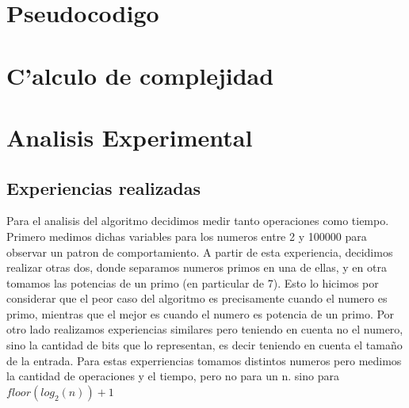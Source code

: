 \section{Pseudocodigo}


\section{C'alculo de complejidad}

\section{Analisis Experimental}
\subsection{Experiencias realizadas}
Para el analisis del algoritmo decidimos medir tanto operaciones como tiempo. Primero medimos dichas variables para los numeros entre 2 y 100000 para observar un patron de comportamiento. A partir de esta experiencia, decidimos realizar otras dos, donde separamos numeros primos en una de ellas, y en otra tomamos las potencias de un primo (en particular de 7). Esto lo hicimos por considerar que el peor caso del algoritmo es precisamente cuando el numero es primo, mientras que el mejor es cuando el numero es potencia de un primo. Por otro lado realizamos experiencias similares pero teniendo en cuenta no el numero, sino la cantidad de bits que lo representan, es decir teniendo en cuenta el tama\~{n}o de la entrada. Para estas experriencias tomamos distintos numeros pero medimos la cantidad de operaciones y el tiempo, pero no para un n. sino para $floor(log_2(n)) + 1$ 
